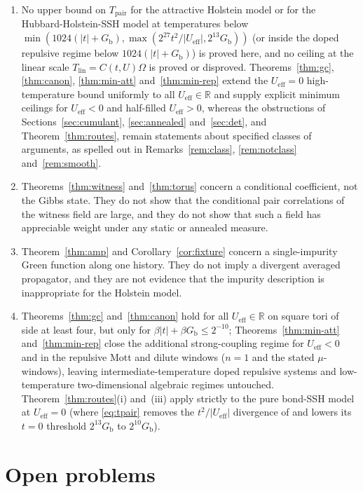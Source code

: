 \documentclass[11pt]{article}
\theoremstyle{definition}
\theoremstyle{remark}
\newcommand{\R}{\mathbb{R}}
\newcommand{\eff}{\mathrm{eff}}
\newcommand{\pair}{\mathrm{pair}}
\newcommand{\Tpair}{T_{\pair}}
\newcommand{\Tlin}{T_{\mathrm{lin}}}
\newcommand{\Gb}{G_{\mathrm{b}}}
\newcommand{\Ueff}{U_{\eff}}
\begin{document}
\begin{enumerate}[label=(\alph*),leftmargin=2.2em]
\item No upper bound on $\Tpair$ for the attractive Holstein model or for the
Hubbard-Holstein-SSH model at temperatures below $\min(1024(|t|+\Gb),
\max(2^{27}t^2/|\Ueff|,2^{13}\Gb))$ (or inside the doped repulsive regime below
$1024(|t|+\Gb)$) is proved here, and no ceiling at the linear scale
$\Tlin=C(t,U)\Omega$ is proved or disproved. Theorems~\ref{thm:gc},
\ref{thm:canon}, \ref{thm:min-att} and~\ref{thm:min-rep} extend the $\Ueff=0$
high-temperature bound uniformly to all $\Ueff\in\R$ and supply explicit minimum
ceilings for $\Ueff<0$ and half-filled $\Ueff>0$, whereas the obstructions of
Sections~\ref{sec:cumulant}, \ref{sec:annealed} and~\ref{sec:det}, and
Theorem~\ref{thm:routes}, remain
statements about specified classes of arguments, as spelled out in
Remarks~\ref{rem:class}, \ref{rem:notclass} and~\ref{rem:smooth}.
\item Theorems~\ref{thm:witness} and~\ref{thm:torus} concern a conditional coefficient,
not the Gibbs state. They do not show that the conditional pair correlations of the
witness field are large, and they do not show that such a field has appreciable weight
under any static or annealed measure.
\item Theorem~\ref{thm:amp} and Corollary~\ref{cor:fixture} concern a single-impurity
Green function along one history. They do not imply a divergent averaged propagator,
and they are not evidence that the impurity description is inappropriate for the
Holstein model.
\item Theorems~\ref{thm:gc} and~\ref{thm:canon} hold for all $\Ueff\in\R$ on square
tori of side at least four, but only for $\beta|t|+\beta\Gb\le2^{-10}$;
Theorems~\ref{thm:min-att} and~\ref{thm:min-rep} close the additional strong-coupling
regime for $\Ueff<0$ and in the repulsive Mott and dilute windows ($n=1$ and the
stated $\mu$-windows), leaving intermediate-temperature doped repulsive systems and
low-temperature two-dimensional algebraic regimes untouched.
Theorem~\ref{thm:routes}(i) and~(iii) apply strictly to the pure bond-SSH model at
$\Ueff=0$ (where \eqref{eq:tpair} removes the $t^2/|\Ueff|$ divergence of
\cite{sshbond3} and lowers its $t=0$ threshold $2^{13}\Gb$ to $2^{10}\Gb$).
\end{enumerate}

\section{Open problems}
\label{sec:open}
\end{document}
